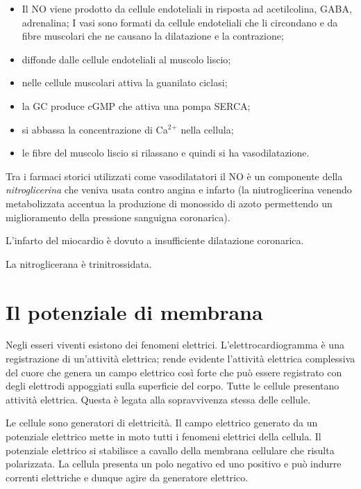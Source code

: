 \documentclass[]{article}
\begin{document}
\begin{itemize}
\itemsep1pt\parskip0pt
\item
  Il NO viene prodotto da cellule endoteliali in risposta ad
  acetilcolina, GABA, adrenalina; I vasi sono formati da cellule
  endoteliali che li circondano e da fibre muscolari che ne causano la
  dilatazione e la contrazione;
\item
  diffonde dalle cellule endoteliali al muscolo liscio;
\item
  nelle cellule muscolari attiva la guanilato ciclasi;
\item
  la GC produce cGMP che attiva una pompa SERCA;
\item
  si abbassa la concentrazione di Ca\(^2\)\(^+\) nella cellula;
\item
  le fibre del muscolo liscio si rilassano e quindi si ha
  vasodilatazione.
\end{itemize}

Tra i farmaci storici utilizzati come vasodilatatori il NO è un
componente della \emph{nitroglicerina} che veniva usata contro angina e
infarto (la niutroglicerina venendo metabolizzata accentua la produzione
di monossido di azoto permettendo un miglioramento della pressione
sanguigna coronarica).

L'infarto del miocardio è dovuto a insufficiente dilatazione coronarica.

La nitroglicerana è trinitrossidata.

\section{Il potenziale di membrana}\label{il-potenziale-di-membrana}

Negli esseri viventi esistono dei fenomeni elettrici.
L'elettrocardiogramma è una registrazione di un'attività elettrica;
rende evidente l'attività elettrica complessiva del cuore che genera un
campo elettrico così forte che può essere registrato con degli elettrodi
appoggiati sulla superficie del corpo. Tutte le cellule presentano
attività elettrica. Questa è legata alla sopravvivenza stessa delle
cellule.

Le cellule sono generatori di elettricità. Il campo elettrico generato
da un potenziale elettrico mette in moto tutti i fenomeni elettrici
della cellula. Il potenziale elettrico si stabilisce a cavallo della
membrana cellulare che risulta polarizzata. La cellula presenta un polo
negativo ed uno positivo e può indurre correnti elettriche e dunque
agire da generatore elettrico.
\end{document}
